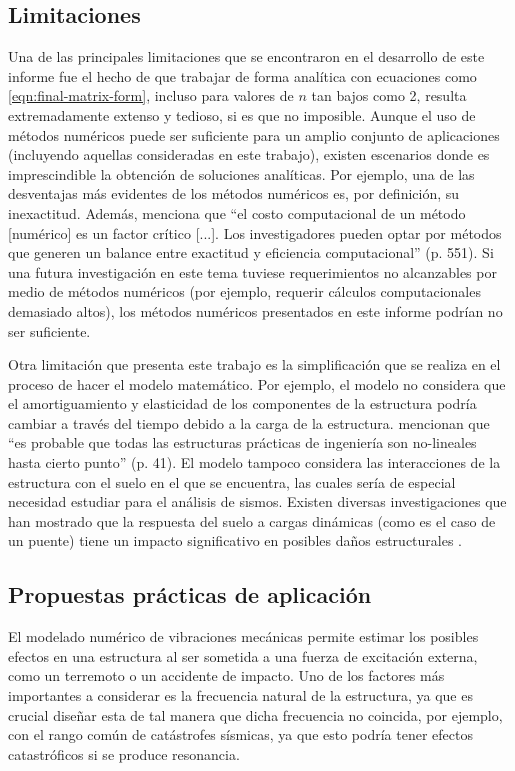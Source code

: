 \subsection{Limitaciones}

Una de las principales limitaciones que se encontraron en el desarrollo de este informe fue el hecho de que trabajar de forma analítica con ecuaciones como \eqref{eqn:final-matrix-form}, incluso para valores de \(n\) tan bajos como 2, resulta extremadamente extenso y tedioso, si es que no imposible. Aunque el uso de métodos numéricos puede ser suficiente para un amplio conjunto de aplicaciones (incluyendo aquellas consideradas en este trabajo), existen escenarios donde es imprescindible la obtención de soluciones analíticas. Por ejemplo, una de las desventajas más evidentes de los métodos numéricos es, por definición, su inexactitud. Además, \citet{kumar} menciona que ``el costo computacional de un método [numérico] es un factor crítico [...]. Los investigadores pueden optar por métodos que generen un balance entre exactitud y eficiencia computacional'' (p. 551). Si una futura investigación en este tema tuviese requerimientos no alcanzables por medio de métodos numéricos (por ejemplo, requerir cálculos computacionales demasiado altos), los métodos numéricos presentados en este informe podrían no ser suficiente.

Otra limitación que presenta este trabajo es la simplificación que se realiza en el proceso de hacer el modelo matemático. Por ejemplo, el modelo no considera que el amortiguamiento y elasticidad de los componentes de la estructura podría cambiar a través del tiempo debido a la carga de la estructura. \citet{worden} mencionan que ``es probable que todas las estructuras prácticas de ingeniería son no-lineales hasta cierto punto'' (p. 41). El modelo tampoco considera las interacciones de la estructura con el suelo en el que se encuentra, las cuales sería de especial necesidad estudiar para el análisis de sismos. Existen diversas investigaciones que han mostrado que la respuesta del suelo a cargas dinámicas (como es el caso de un puente) tiene un impacto significativo en posibles daños estructurales \citep{bapir}.


\subsection{Propuestas prácticas de aplicación}

El modelado numérico de vibraciones mecánicas permite estimar los posibles efectos en una estructura al ser sometida a una fuerza de excitación externa, como un terremoto o un accidente de impacto. Uno de los factores más importantes a considerar es la frecuencia natural de la estructura, ya que es crucial diseñar esta de tal manera que dicha frecuencia no coincida, por ejemplo, con el rango común de catástrofes sísmicas, ya que esto podría tener efectos catastróficos si se produce resonancia.

